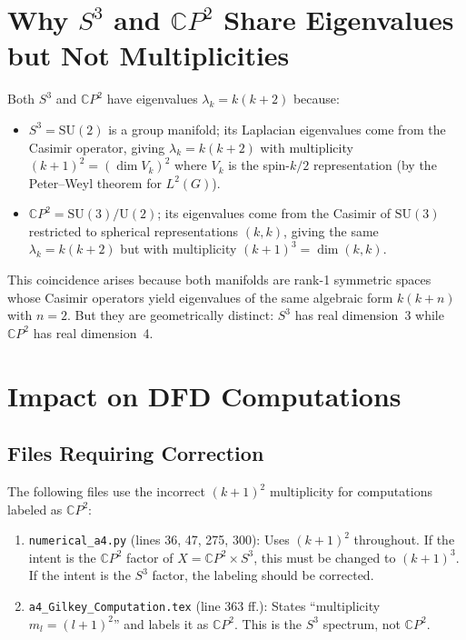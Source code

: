 \documentclass[11pt]{article}
\theoremstyle{remark}
\begin{document}
\section{Why $S^3$ and $\mathbb{C}P^2$ Share Eigenvalues but Not
Multiplicities}

Both $S^3$ and $\mathbb{C}P^2$ have eigenvalues $\lambda_k = k(k+2)$ because:

\begin{itemize}
\item $S^3 = \mathrm{SU}(2)$ is a group manifold; its Laplacian eigenvalues
  come from the Casimir operator, giving $\lambda_k = k(k+2)$ with
  multiplicity $(k+1)^2 = (\dim V_k)^2$ where $V_k$ is the spin-$k/2$
  representation (by the Peter--Weyl theorem for $L^2(G)$).

\item $\mathbb{C}P^2 = \mathrm{SU}(3)/\mathrm{U}(2)$; its eigenvalues come
  from the Casimir of $\mathrm{SU}(3)$ restricted to spherical representations
  $(k,k)$, giving the same $\lambda_k = k(k+2)$ but with multiplicity
  $(k+1)^3 = \dim(k,k)$.
\end{itemize}

This coincidence arises because both manifolds are rank-1 symmetric spaces
whose Casimir operators yield eigenvalues of the same algebraic form $k(k+n)$
with $n=2$.  But they are geometrically distinct: $S^3$ has real dimension~3
while $\mathbb{C}P^2$ has real dimension~4.

\section{Impact on DFD Computations}

\subsection{Files Requiring Correction}

The following files use the incorrect $(k+1)^2$ multiplicity for computations
labeled as $\mathbb{C}P^2$:

\begin{enumerate}
\item \texttt{numerical\_a4.py} (lines 36, 47, 275, 300): Uses
  $(k+1)^2$ throughout.  If the intent is the $\mathbb{C}P^2$ factor of
  $X = \mathbb{C}P^2 \times S^3$, this must be changed to $(k+1)^3$.
  If the intent is the $S^3$ factor, the labeling should be corrected.

\item \texttt{a4\_Gilkey\_Computation.tex} (line 363 ff.): States
  ``multiplicity $m_l = (l+1)^2$'' and labels it as $\mathbb{C}P^2$.
  This is the $S^3$ spectrum, not $\mathbb{C}P^2$.
\end{enumerate}
\end{document}
